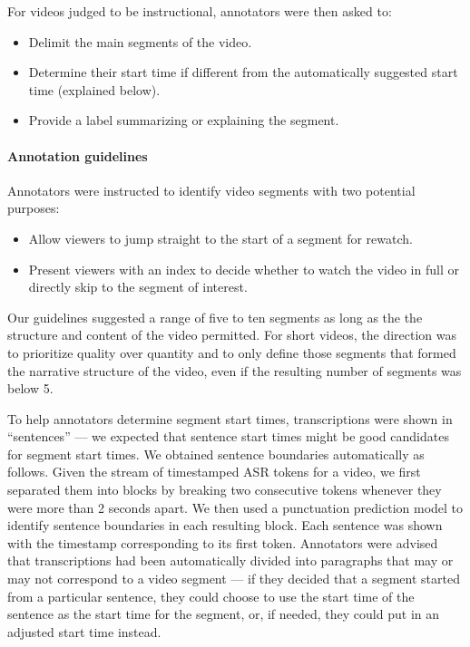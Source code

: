 \documentclass[11pt,a4paper]{article}
\begin{document}
For videos judged to be instructional, annotators were then asked to:
\begin{itemize}
\item Delimit the main segments of the video.
\item Determine their start time if different from the automatically suggested start time (explained below).
\item Provide a label summarizing or explaining the segment. 
\end{itemize}

\paragraph{Annotation guidelines}
Annotators were instructed to identify video segments with two potential purposes:
\begin{itemize}
\item Allow viewers to jump straight to the start of a segment for rewatch.
\item Present viewers with an index to decide whether to watch the video in full or directly skip to the segment of interest.
\end{itemize}

Our guidelines suggested a range of five to ten segments as long as the the structure and content of the video permitted. For short videos, the direction was to prioritize quality over quantity and to only define those segments that formed the narrative structure of the video, even if the resulting number of segments was below 5. 



To help annotators determine segment start times, transcriptions were shown in ``sentences'' --- we expected that sentence start times might be good candidates for segment start times.   We obtained sentence boundaries automatically as follows.
Given the stream of timestamped ASR tokens for a video, we first separated them into blocks by breaking two consecutive tokens whenever they were more than 2 seconds apart.  We then used a punctuation prediction model to identify sentence boundaries in each resulting block.  Each sentence was shown with the timestamp corresponding to its first token.  Annotators were advised that transcriptions had been automatically divided into paragraphs that may or may not correspond to a video segment --- if they decided that a segment started from a particular sentence, they could choose to use the start time of the sentence as the start time for the segment, or, if needed, they could put in an adjusted start time instead.
\end{document}
